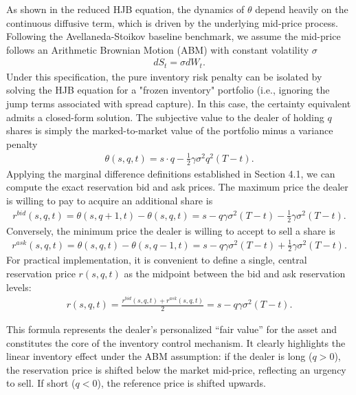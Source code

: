 \documentclass[a4paper,10pt,titlepage,oneside,openany]{book}
\theoremstyle{plain}\newtheorem{theorem}{Theorem}[chapter]
\theoremstyle{definition}\newtheorem{definition}{Definition}[chapter]
\theoremstyle{remark}\newtheorem{remark}{Remark}[chapter]
\begin{document}
As shown in the reduced HJB equation, the dynamics of $\theta$ depend heavily on the continuous diffusive term, which is driven by the underlying mid-price process. Following the Avellaneda-Stoikov baseline benchmark, we assume the mid-price follows an Arithmetic Brownian Motion (ABM) with constant volatility $\sigma$
\begin{align*}
    dS_t = \sigma dW_t.
\end{align*}
Under this specification, the pure inventory risk penalty can be isolated by solving the HJB equation for a "frozen inventory" portfolio (i.e., ignoring the jump terms associated with spread capture). In this case, the certainty equivalent admits a closed-form solution. The subjective value to the dealer of holding $q$ shares is simply the marked-to-market value of the portfolio minus a variance penalty
\begin{align*}
    \theta(s,q,t) = s \cdot q - \frac{1}{2}\gamma\sigma^2 q^2 (T-t).
\end{align*}
Applying the marginal difference definitions established in Section 4.1, we can compute the exact reservation bid and ask prices. The maximum price the dealer is willing to pay to acquire an additional share is
\begin{align*}
    r^{bid}(s,q,t) = \theta(s,q+1,t) - \theta(s,q,t) = s - q\gamma\sigma^2(T-t) - \frac{1}{2}\gamma\sigma^2(T-t).
\end{align*}
Conversely, the minimum price the dealer is willing to accept to sell a share is
\begin{align*}
    r^{ask}(s,q,t) = \theta(s,q,t) - \theta(s,q-1,t) = s - q\gamma\sigma^2(T-t) + \frac{1}{2}\gamma\sigma^2(T-t).
\end{align*}
For practical implementation, it is convenient to define a single, central reservation price $r(s,q,t)$ as the midpoint between the bid and ask reservation levels:
\begin{align*}
    r(s,q,t) = \frac{r^{bid}(s,q,t) + r^{ask}(s,q,t)}{2} = s - q\gamma\sigma^2(T-t).
\end{align*}

This formula represents the dealer's personalized ``fair value'' for the asset and constitutes the core of the inventory control mechanism. It clearly highlights the linear inventory effect under the ABM assumption: if the dealer is long ($q > 0$), the reservation price is shifted below the market mid-price, reflecting an urgency to sell. If short ($q < 0$), the reference price is shifted upwards. 
\end{document}
